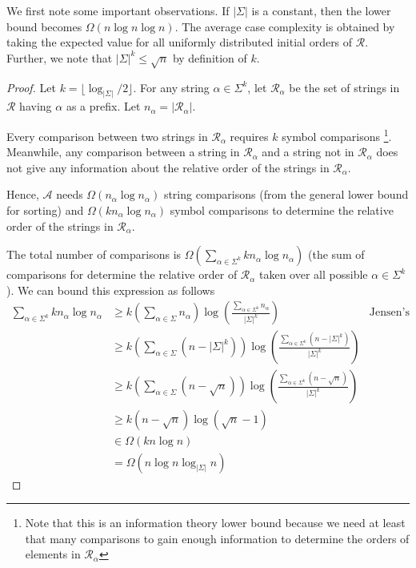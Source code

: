 We first note some important observations. If $|\Sigma|$ is a constant, then the lower bound becomes $\Omega(n \log n \log n)$. The average case complexity is obtained by taking the expected value for all uniformly distributed initial orders of $\mathcal{R}$. Further, we note that $|\Sigma|^k \leq \sqrt{n}$ by definition of $k$.

\begin{proof}
    Let $k = \lfloor \log_{|\Sigma|}/2 \rfloor$. For any string $\alpha \in \Sigma^k$, let $\mathcal{R}_{\alpha}$ be the set of strings in $\mathcal{R}$ having $\alpha$ as a prefix. Let $n_{\alpha} = |\mathcal{R}_{\alpha}|$.

    Every comparison between two strings in $\mathcal{R}_\alpha$ requires $k$ symbol comparisons \footnote{Note that this is an information theory lower bound because we need at least that many comparisons to gain enough information to determine the orders of elements in $\mathcal{R}_\alpha$}. Meanwhile, any comparison between a string in $\mathcal{R}_\alpha$ and a string not in $\mathcal{R}_\alpha$ does not give any information about the relative order of the strings in $\mathcal{R}_\alpha$.

    Hence, $\mathcal{A}$ needs $\Omega(n_\alpha \log n_\alpha)$ string comparisons (from the general lower bound for sorting) and $\Omega(k n_\alpha \log n_\alpha)$ symbol comparisons to determine the relative order of the strings in $\mathcal{R}_\alpha$.

    The total number of comparisons is $\Omega(\sum_{\alpha \in \Sigma^k} k n_\alpha \log n_\alpha)$ (the sum of comparisons for determine the relative order of $\mathcal{R}_\alpha$ taken over all possible $\alpha \in \Sigma^k$). We can bound this expression as follows
    $$
    \begin{aligned}
        \sum_{\alpha \in \Sigma^k} kn_\alpha \log n_\alpha &\geq k \left( \sum_{\alpha \in \Sigma} n_\alpha \right) \log \left( \frac{\sum_{\alpha \in \Sigma^k} n_\alpha}{|\Sigma|^k} \right) & \text{Jensen's ineq.} \\
        &\geq k \left( \sum_{\alpha \in \Sigma} (n - |\Sigma|^k) \right) \log \left( \frac{\sum_{\alpha \in \Sigma^k} (n - |\Sigma|^k)}{|\Sigma|^k} \right) \\
        &\geq k \left( \sum_{\alpha \in \Sigma} (n - \sqrt{n}) \right) \log \left( \frac{\sum_{\alpha \in \Sigma^k} (n - \sqrt{n})}{|\Sigma|^k} \right) \\
        &\geq k (n - \sqrt{n}) \log (\sqrt{n} - 1) \\
        &\in \Omega(k n \log n) \\
        &= \Omega(n \log n \log_{|\Sigma|} n)
    \end{aligned}
    $$
\end{proof}

